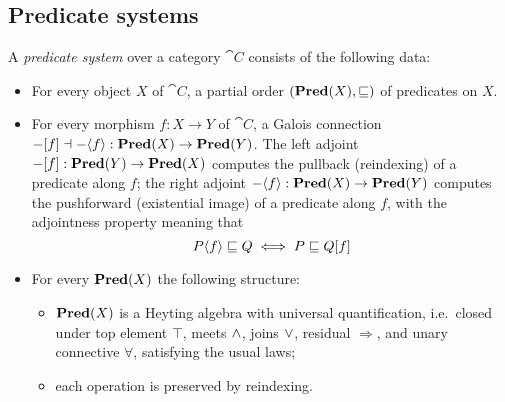 \subsection{Predicate systems}
\label{sec:predicate-system}

A \emph{predicate system} over a category $\cat{C}$ consists of the following data:
\begin{itemize}
\item For every object $X$ of $\cat{C}$, a partial order $(\mathbf{Pred}(X), \sqsubseteq)$ of predicates on $X$.
\item For every morphism $f: X \to Y$ of $\cat{C}$, a Galois connection $-[f] \dashv
-\langle f\rangle : \mathbf{Pred}(X) \to \mathbf{Pred}(Y)$. The left adjoint $-[f]: \mathbf{Pred}(Y) \to \mathbf{Pred}(X)$ computes
the pullback (reindexing) of a predicate along $f$; the right adjoint $-\langle f\rangle: \mathbf{Pred}(X) \to
\mathbf{Pred}(Y)$ computes the pushforward (existential image) of a predicate along $f$, with the adjointness property
meaning that
\[P\langle f\rangle \sqsubseteq Q \iff P \sqsubseteq Q[f] \]
\item For every $\mathbf{Pred}(X)$ the following structure:
   \begin{itemize}
   \item $\mathbf{Pred}(X)$ is a Heyting algebra with universal quantification, i.e.~closed under top element $\top$,
   meets $\wedge$, joins $\vee$, residual $\Rightarrow$, and unary connective $\forall$, satisfying the usual
   laws;
   \item each operation is preserved by reindexing.
   \end{itemize}
\end{itemize}
